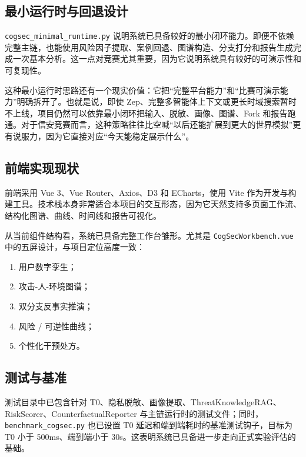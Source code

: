 \documentclass[12pt,a4paper]{ctexart}
\begin{document}
\subsection{最小运行时与回退设计}

\texttt{cogsec\_minimal\_runtime.py} 说明系统已具备较好的最小闭环能力。即便不依赖完整主链，也能使用风险因子提取、案例回退、图谱构造、分支打分和报告生成完成一次基本分析。这一点对竞赛尤其重要，因为它说明系统具有较好的可演示性和可复现性。

这种最小运行时思路还有一个现实价值：它把“完整平台能力”和“比赛可演示能力”明确拆开了。也就是说，即使 Zep、完整多智能体上下文或更长时域搜索暂时不上线，项目仍然可以依靠最小闭环把输入、脱敏、画像、图谱、Fork 和报告跑通。对于信安竞赛而言，这种策略往往比空喊“以后还能扩展到更大的世界模拟”更有说服力，因为它直接对应“今天能稳定展示什么”。

\subsection{前端实现现状}

前端采用 Vue 3、Vue Router、Axios、D3 和 ECharts，使用 Vite 作为开发与构建工具。技术栈本身非常适合本项目的交互形态，因为它天然支持多页面工作流、结构化图谱、曲线、时间线和报告可视化。

从当前组件结构看，系统已具备完整工作台雏形。尤其是 \texttt{CogSecWorkbench.vue} 中的五屏设计，与项目定位高度一致：
\begin{enumerate}[leftmargin=2em]
  \item 用户数字孪生；
  \item 攻击-人-环境图谱；
  \item 双分支反事实推演；
  \item 风险 / 可逆性曲线；
  \item 个性化干预处方。
\end{enumerate}

\subsection{测试与基准}

测试目录中已包含针对 T0、隐私脱敏、画像提取、ThreatKnowledgeRAG、RiskScorer、CounterfactualReporter 与主链运行时的测试文件；同时，\texttt{benchmark\_cogsec.py} 也已设置 T0 延迟和端到端耗时的基准测试钩子，目标为 T0 小于 500ms、端到端小于 30s。这表明系统已具备进一步走向正式实验评估的基础。
\end{document}
